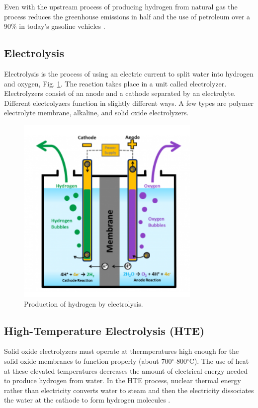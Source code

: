 \documentclass{anstrans}
\begin{document}
Even with the upstream process of producing hydrogen from natural gas the process reduces the greenhouse emissions in half and the use of petroleum over a 90\% in today's gasoline vehicles \cite{noauthor_hydrogen_nodate}.

\subsection{Electrolysis}

Electrolysis is the process of using an electric current to split water into hydrogen and oxygen, Fig. \ref{fig:electro}. The reaction takes place in a unit called electrolyzer. Electrolyzers consist of an anode and a cathode separated by an electrolyte. Different electrolyzers function in slightly different ways. A few types are polymer electrolyte membrane, alkaline, and solid oxide electrolyzers.

\begin{figure}[]
	\centering
	\includegraphics[width=0.55\linewidth]{figures/electrolysis.png}
	\hfill
	\caption{Production of hydrogen by electrolysis.}
	\label{fig:electro}
\end{figure}

\subsection{High-Temperature Electrolysis (HTE)}

Solid oxide electrolyzers must operate at thermperatures high enough for the solid oxide membranes to function properly (about 700$^{\circ}$-800$^{\circ}$C). The use of heat at these elevated temperatures decreases the amount of electrical energy needed to produce hydrogen from water. In the HTE process, nuclear thermal energy rather than electricity converts water to steam and then the electricity dissociates the water at the cathode to form hydrogen molecules \cite{xu_introduction_2017}.
\end{document}
